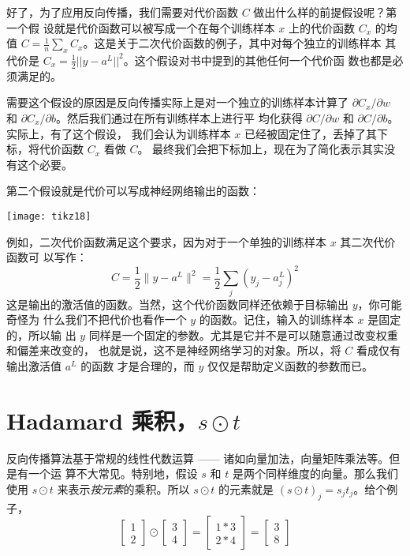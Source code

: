 好了，为了应用反向传播，我们需要对代价函数 $C$ 做出什么样的前提假设呢？第一个假
设就是代价函数可以被写成一个在每个训练样本 $x$ 上的代价函数 $C_x$ 的均值
$C=\frac{1}{n} \sum_x C_x$。这是关于二次代价函数的例子，其中对每个独立的训练样本
其代价是 $C_x = \frac{1}{2} ||y-a^L||^2$。这个假设对书中提到的其他任何一个代价函
数也都是必须满足的。

需要这个假设的原因是反向传播实际上是对一个独立的训练样本计算了 $\partial
C_x/\partial w$ 和 $\partial C_x/\partial b$。然后我们通过在所有训练样本上进行平
均化获得 $\partial C/\partial w$ 和 $\partial C/\partial b$。实际上，有了这个假设，
我们会认为训练样本 $x$ 已经被固定住了，丢掉了其下标，将代价函数 $C_x$ 看做 $C$。
最终我们会把下标加上，现在为了简化表示其实没有这个必要。

第二个假设就是代价可以写成神经网络输出的函数：

\begin{center}
  \texttt{[image: tikz18]}
\end{center}

例如，二次代价函数满足这个要求，因为对于一个单独的训练样本 $x$ 其二次代价函数可
以写作：
\begin{equation}
  C = \frac{1}{2} \|y-a^L\|^2 = \frac{1}{2} \sum_j (y_j-a^L_j)^2
  \label{eq:27}\tag{27}
\end{equation}
这是输出的激活值的函数。当然，这个代价函数同样还依赖于目标输出 $y$，你可能奇怪为
什么我们不把代价也看作一个 $y$ 的函数。记住，输入的训练样本 $x$ 是固定的，所以输
出 $y$ 同样是一个固定的参数。尤其是它并不是可以随意通过改变权重和偏差来改变的，
也就是说，这不是神经网络学习的对象。所以，将 $C$ 看成仅有输出激活值 $a^L$ 的函数
才是合理的，而 $y$ 仅仅是帮助定义函数的参数而已。

\section{Hadamard 乘积，$s \odot t$}
\label{sec:the_hadamard_product}

反向传播算法基于常规的线性代数运算 —— 诸如向量加法，向量矩阵乘法等。但是有一个运
算不大常见。特别地，假设 $s$ 和 $t$ 是两个同样维度的向量。那么我们使用 $s\odot
t$ 来表示\emph{按元素}的乘积。所以 $s\odot t$ 的元素就是 $(s\odot t)_j = s_j
t_j$。给个例子，
\begin{equation}
  \left[\begin{array}{c} 1 \\ 2 \end{array}\right]
  \odot \left[\begin{array}{c} 3 \\ 4\end{array} \right]
  = \left[ \begin{array}{c} 1 * 3 \\ 2 * 4 \end{array} \right]
  = \left[ \begin{array}{c} 3 \\ 8 \end{array} \right]
  \label{eq:28}\tag{28}
\end{equation}

